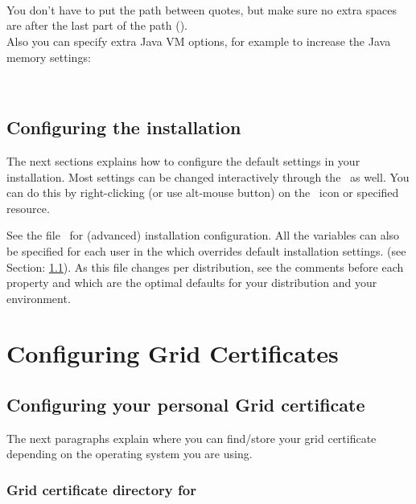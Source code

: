 	\tab \Path{\#\#}\\
	\tab {}\\
	\tab {}\\

You don't have to put the path between quotes, but make sure no extra spaces are
after the last part of the path ().\\
Also you can specify extra Java VM options, for example to increase the Java
memory settings: 

	\tab {}\\
	\tab {}
	
	
\subsection{Configuring the installation}

 The next sections explains how to configure the default settings in your
 installation. 
 Most settings can be changed interactively through the \vbrowser\ as well.
 You can do this by right-clicking (or use alt-mouse button) on
 the \myvle\ icon or specified resource.
\par
 See the file \VLETCONF\ for (advanced) installation configuration. All the
 variables can also be specified for each user in the
  which overrides default installation settings. (see
 Section: \ref{sec:user_configuration}). As this file changes per distribution,
 see the comments before each property and which are the optimal defaults for your
 distribution and your environment. \\


\section{Configuring Grid Certificates}


\subsection{Configuring your personal Grid certificate}
\label{sec:user_configuration}

The next paragraphs explain where you can find/store your grid certificate
depending on the operating system you are using. 

\subsubsection{Grid certificate directory for \Linux}

